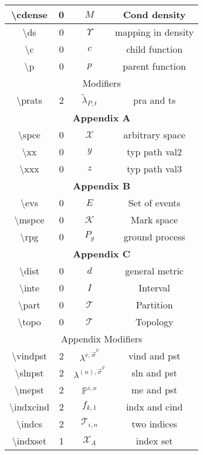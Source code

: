 \documentclass[12pt]{article}
\newcommand{\mb}{\mathbb}
\newcommand{\mc}{\mathcal}
\newcommand{\tbs}{\textbackslash}
\newcommand{\pr}{\mb{P}}							%
\renewcommand{\v}{v}							%
\renewcommand{\S}{S}							%
\newcommand{\s}{\sigma}							%
\newcommand{\sv}{\vec{\s}}						%
\newcommand{\x}{x}								%
\renewcommand{\t}{t}							%
\newcommand{\vind}[1]{^{#1}}					%
\newcommand{\vsi}[1]{^{#1}}						%
\newcommand{\cind}[1]{_{#1}}					%
\newcommand{\ts}[1]{_{#1}}						%
\newcommand{\sln}[1]{^{(#1)}}					%
\newcommand{\rate}{\lambda}						%
\newcommand{\alt}[1]{\widetilde{#1}}			%
\newcommand{\pra}[1]{_{#1}}						%
\newcommand{\indx}[1]{_{#1}}					%
\newcommand{\pst}[1]{^{#1}}						%
\newcommand{\me}[1]{^{#1}}						%
\newcommand{\rp}{P}								%
\newcommand{\crate}{\alt{\lambda}}				%
\newcommand{\cdense}{M}							%
\newcommand{\ds}{\Upsilon}						%
\renewcommand{\c}{c}							%
\newcommand{\p}{p}								%
\newcommand{\prats}[2]{_{#1,#2}}				%
\newcommand{\spce}{\mc{X}}						%
\newcommand{\xx}{y}								%
\newcommand{\xxx}{z}							%
\newcommand{\evs}{E}							%
\newcommand{\mspce}{\mc{K}}						%
\newcommand{\rpg}{\rp_g}						%
\newcommand{\dist}{d}							%
\newcommand{\inte}{I}							%
\renewcommand{\part}{\mc{T}}					%
\newcommand{\topo}{\mc{T}}						%
\newcommand{\vindpst}[2]{^{#1,#2}}				%
\newcommand{\slnpst}[2]{^{(#1),#2}}				%
\newcommand{\mepst}[2]{^{#1,#2}}				%
\newcommand{\indxcind}[2]{_{#1,#2}}				%
\newcommand{\indcs}[2]{_{#1,#2}}				%
\newcommand{\indxset}[1]{_{#1}}					%
\begin{document}
\begin{longtable}{|c|c|c|c|}
\tbs cdense & 0 & \(\cdense\) & Cond density\\\hline
\tbs ds & 0 & \(\ds\) & mapping in density\\\hline
\tbs c & 0 & \(\c\) & child function\\\hline
\tbs p & 0 & \(\p\) & parent function\\\hline
\multicolumn{4}{|c|}{Modifiers}\\\hline
\tbs prats & 2 & \(\crate\prats{\rp}{\t}\) & pra and ts\\\hline
\multicolumn{4}{|c|}{\textbf{Appendix A}}\\\hline
\tbs spce & 0 & \(\spce\) & arbitrary space\\\hline
\tbs xx & 0 & \(\xx\) & typ path val2\\\hline
\tbs xxx & 0 & \(\xxx\) & typ path val3\\\hline
\multicolumn{4}{|c|}{\textbf{Appendix B}}\\\hline
\tbs evs & 0 & \(\evs\) & Set of events\\\hline
\tbs mspce & 0 & \(\mspce\) & Mark space\\\hline
\tbs rpg & 0 & \(\rpg\) & ground process\\\hline
\multicolumn{4}{|c|}{\textbf{Appendix C}}\\\hline
\tbs dist & 0 & \(\dist\) & general metric\\\hline
\tbs inte & 0 & \(\inte\) & Interval\\\hline
\tbs part& 0 & \(\part\) & Partition\\\hline
\tbs topo & 0 & \(\topo\) & Topology\\\hline
\multicolumn{4}{|c|}{Appendix Modifiers}\\\hline
\tbs vindpst & 2 & \(\rate\vindpst{\v}{\sv\vsi{V}}\) & vind and pst\\\hline
\tbs slnpst & 2 & \(\rate\slnpst{n}{\sv\vsi{V}}\) & sln and pst\\\hline
\tbs mepst & 2 & \(\pr\mepst{i}{\x}\) & me and pst\\\hline
\tbs indxcind & 2 & \(f\indxcind{k}{1}\) & indx and cind\\\hline
\tbs indcs & 2 & \(\part\indcs{i}{n}\) & two indices\\\hline
\tbs indxset & 1 & \(\spce\indxset{A}\) & index set\\\hline
\end{longtable}
\end{document}
